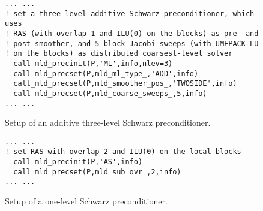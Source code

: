 \begin{figure}[tbh]
\begin{center}
\begin{minipage}{.90\textwidth} 
{\small
\begin{verbatim}
... ...
! set a three-level additive Schwarz preconditioner, which uses 
! RAS (with overlap 1 and ILU(0) on the blocks) as pre- and 
! post-smoother, and 5 block-Jacobi sweeps (with UMFPACK LU
! on the blocks) as distributed coarsest-level solver
  call mld_precinit(P,'ML',info,nlev=3)
  call mld_precset(P,mld_ml_type_,'ADD',info)
  call_mld_precset(P,mld_smoother_pos_,'TWOSIDE',info)
  call mld_precset(P,mld_coarse_sweeps_,5,info)
... ...
\end{verbatim}
}
\end{minipage}

\caption{Setup of an additive three-level Schwarz preconditioner.\label{fig:ex_3la}}
\end{center}
\end{figure}

\begin{figure}[tbh]
\begin{center}
\begin{minipage}{.90\textwidth} 
{\small
\begin{verbatim}
... ...
! set RAS with overlap 2 and ILU(0) on the local blocks
  call mld_precinit(P,'AS',info)
  call mld_precset(P,mld_sub_ovr_,2,info)
... ...
\end{verbatim}
}
\end{minipage}
\caption{Setup of a one-level Schwarz preconditioner.\label{fig:ex_1l}}
\end{center}
\end{figure}


